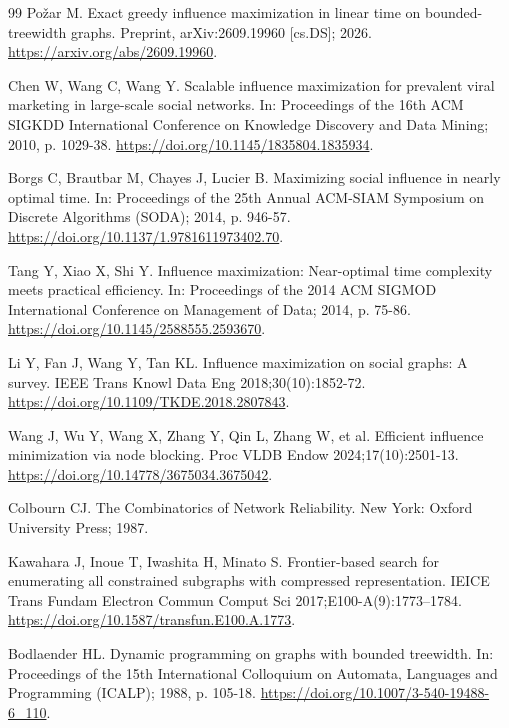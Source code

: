 \documentclass[preprint,11pt]{elsarticle}
\theoremstyle{definition}
\theoremstyle{remark}
\begin{document}
\begin{thebibliography}{99}
Požar M. Exact greedy influence maximization in linear time on bounded-treewidth graphs. Preprint, arXiv:2609.19960 [cs.DS]; 2026. \url{https://arxiv.org/abs/2609.19960}.

Chen W, Wang C, Wang Y. Scalable influence maximization for prevalent viral marketing in large-scale social networks. In: Proceedings of the 16th ACM SIGKDD International Conference on Knowledge Discovery and Data Mining; 2010, p. 1029-38. \url{https://doi.org/10.1145/1835804.1835934}.

Borgs C, Brautbar M, Chayes J, Lucier B. Maximizing social influence in nearly optimal time. In: Proceedings of the 25th Annual ACM-SIAM Symposium on Discrete Algorithms (SODA); 2014, p. 946-57. \url{https://doi.org/10.1137/1.9781611973402.70}.

Tang Y, Xiao X, Shi Y. Influence maximization: Near-optimal time complexity meets practical efficiency. In: Proceedings of the 2014 ACM SIGMOD International Conference on Management of Data; 2014, p. 75-86. \url{https://doi.org/10.1145/2588555.2593670}.

Li Y, Fan J, Wang Y, Tan KL. Influence maximization on social graphs: A survey. IEEE Trans Knowl Data Eng 2018;30(10):1852-72. \url{https://doi.org/10.1109/TKDE.2018.2807843}.

Wang J, Wu Y, Wang X, Zhang Y, Qin L, Zhang W, et al. Efficient influence minimization via node blocking. Proc VLDB Endow 2024;17(10):2501-13. \url{https://doi.org/10.14778/3675034.3675042}.

Colbourn CJ. The Combinatorics of Network Reliability. New York: Oxford University Press; 1987.

Kawahara J, Inoue T, Iwashita H, Minato S. Frontier-based search for enumerating all constrained subgraphs with compressed representation. IEICE Trans Fundam Electron Commun Comput Sci 2017;E100-A(9):1773--1784. \url{https://doi.org/10.1587/transfun.E100.A.1773}.

Bodlaender HL. Dynamic programming on graphs with bounded treewidth. In: Proceedings of the 15th International Colloquium on Automata, Languages and Programming (ICALP); 1988, p. 105-18. \url{https://doi.org/10.1007/3-540-19488-6_110}.


\end{thebibliography}
\end{document}
